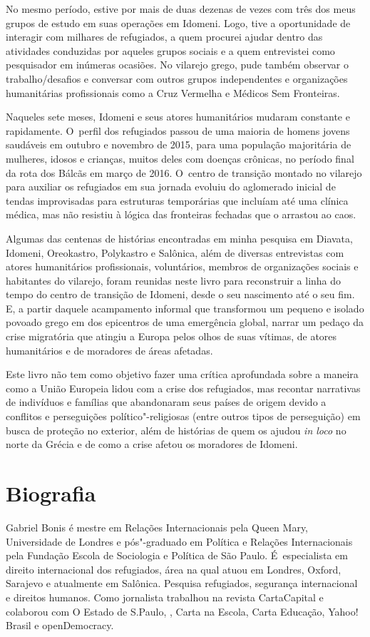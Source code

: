No mesmo período, estive por mais de duas dezenas de vezes com três dos
meus grupos de estudo em suas operações em Idomeni. Logo, tive a
oportunidade de interagir com milhares de refugiados, a quem procurei
ajudar dentro das atividades conduzidas por aqueles grupos sociais e a
quem entrevistei como pesquisador em inúmeras ocasiões. No vilarejo
grego, pude também observar o trabalho/desafios e conversar com outros
grupos independentes e organizações humanitárias profissionais como a
Cruz Vermelha e Médicos Sem Fronteiras.

Naqueles sete meses, Idomeni e seus atores humanitários mudaram
constante e rapidamente. O~perfil dos refugiados passou de uma maioria
de homens jovens saudáveis em outubro e novembro de 2015, para uma
população majoritária de mulheres, idosos e crianças, muitos deles com
doenças crônicas, no período final da rota dos Bálcãs em março de 2016.
O~centro de transição montado no vilarejo para auxiliar os refugiados em
sua jornada evoluiu do aglomerado inicial de tendas improvisadas para
estruturas temporárias que incluíam até uma clínica médica, mas não
resistiu à lógica das fronteiras fechadas que o arrastou ao caos. 

Algumas das centenas de histórias encontradas em minha pesquisa em
Diavata, Idomeni, Oreokastro, Polykastro e Salônica, além de diversas
entrevistas com atores humanitários profissionais, voluntários, membros
de organizações sociais e habitantes do vilarejo, foram reunidas neste
livro para reconstruir a linha do tempo do centro de transição de
Idomeni, desde o seu nascimento até o seu fim. E, a partir daquele
acampamento informal que transformou um pequeno e isolado povoado grego
em dos epicentros de uma emergência global, narrar um pedaço da crise
migratória que atingiu a Europa pelos olhos de suas vítimas, de atores
humanitários e de moradores de áreas afetadas.

Este livro não tem como objetivo fazer uma crítica aprofundada sobre a
maneira como a União Europeia lidou com a crise dos refugiados, mas
recontar narrativas de indivíduos e famílias que abandonaram seus países
de origem devido a conflitos e perseguições político"-religiosas (entre
outros tipos de perseguição) em busca de proteção no exterior, além de
histórias de quem os ajudou \emph{in loco} no norte da Grécia e de como
a crise afetou os moradores de Idomeni.

\section{Biografia}

Gabriel Bonis é mestre em Relações Internacionais pela Queen Mary,
Universidade de Londres e pós"-graduado em Política e Relações
Internacionais pela Fundação Escola de Sociologia e Política de São
Paulo. É~especialista em direito internacional dos refugiados, área na
qual atuou em Londres, Oxford, Sarajevo e atualmente em Salônica.
Pesquisa refugiados, segurança internacional e direitos humanos. Como
jornalista trabalhou na revista CartaCapital e colaborou com O Estado de
S.Paulo, , Carta na Escola, Carta Educação, Yahoo! Brasil e
openDemocracy.


